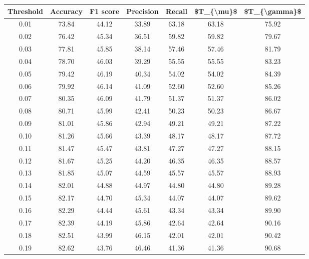 \begin{tabular}{|c|c|c|c|c|c|c|}
\hline
 Threshold &  Accuracy &  F1 score &  Precision &  Recall &  \$T\_\{\textbackslash mu\}\$ &  \$T\_\{\textbackslash gamma\}\$ \\
\hline
      0.01 &     73.84 &     44.12 &      33.89 &   63.18 &      63.18 &         75.92 \\
      0.02 &     76.42 &     45.34 &      36.51 &   59.82 &      59.82 &         79.67 \\
      0.03 &     77.81 &     45.85 &      38.14 &   57.46 &      57.46 &         81.79 \\
      0.04 &     78.70 &     46.03 &      39.29 &   55.55 &      55.55 &         83.23 \\
      0.05 &     79.42 &     46.19 &      40.34 &   54.02 &      54.02 &         84.39 \\
      0.06 &     79.92 &     46.14 &      41.09 &   52.60 &      52.60 &         85.26 \\
      0.07 &     80.35 &     46.09 &      41.79 &   51.37 &      51.37 &         86.02 \\
      0.08 &     80.71 &     45.99 &      42.41 &   50.23 &      50.23 &         86.67 \\
      0.09 &     81.01 &     45.86 &      42.94 &   49.21 &      49.21 &         87.22 \\
      0.10 &     81.26 &     45.66 &      43.39 &   48.17 &      48.17 &         87.72 \\
      0.11 &     81.47 &     45.47 &      43.81 &   47.27 &      47.27 &         88.15 \\
      0.12 &     81.67 &     45.25 &      44.20 &   46.35 &      46.35 &         88.57 \\
      0.13 &     81.85 &     45.07 &      44.59 &   45.57 &      45.57 &         88.93 \\
      0.14 &     82.01 &     44.88 &      44.97 &   44.80 &      44.80 &         89.28 \\
      0.15 &     82.17 &     44.70 &      45.34 &   44.07 &      44.07 &         89.62 \\
      0.16 &     82.29 &     44.44 &      45.61 &   43.34 &      43.34 &         89.90 \\
      0.17 &     82.39 &     44.19 &      45.86 &   42.64 &      42.64 &         90.16 \\
      0.18 &     82.51 &     43.99 &      46.15 &   42.01 &      42.01 &         90.42 \\
      0.19 &     82.62 &     43.76 &      46.46 &   41.36 &      41.36 &         90.68 \\

\end{tabular}
